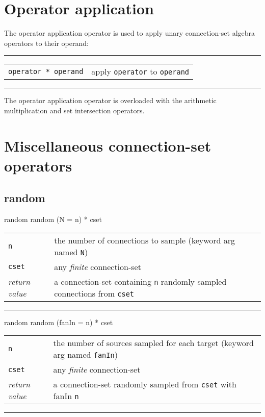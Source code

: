 \documentclass[a4paper,twoside]{report}
\makeatletter
\newenvironment{parameters}%
{\begin{tabular}{@{\hspace{2em}}lp{0.6\textwidth}}}%
{\end{tabular}\par\vspace{1mm}\par\hrule\par\vspace{5mm}}
\newcommand{\fa}[1]{\lstinline|#1|}
\newcommand{\expr}[1]{\lstinline|#1|}
\newcommand{\ret}{\emph{return value}}
\makeatother
\begin{document}
\section{Operator application}
The operator application operator is used to apply unary
connection-set algebra operators to their operand:
\par\vspace{4mm}\hrule\par\vspace{1mm}
\begin{tabular}{@{\hspace{2em}}lp{}}
  \expr{operator * operand} & apply \fa{operator} to \fa{operand}\\
\end{tabular}\par\vspace{1mm}\par\hrule\par\vspace{5mm}
The operator application operator is overloaded with the arithmetic
multiplication and set intersection operators.

\section{Miscellaneous connection-set operators}\label{sec:miscop}

\subsection{random}\label{sec:randomop}
\begin{head}{random}
  random (N = n) * cset
\end{head}
\begin{parameters}
  \lstinline|n| &%
  the number of connections to sample (keyword arg named \fa{N})\\
  \fa{cset} &%
  any \emph{finite} connection-set\\
  \ret &%
  a connection-set containing \fa{n} randomly sampled connections from
  \fa{cset}\\
\end{parameters}

\begin{head}{random}
  random (fanIn = n) * cset
\end{head}
\begin{parameters}
  \lstinline|n| &%
  the number of sources sampled for each target (keyword arg named \fa{fanIn})\\
  \fa{cset} &%
  any \emph{finite} connection-set\\
  \ret &%
  a connection-set randomly sampled from \fa{cset} with fanIn \fa{n}\\
\end{parameters}
\end{document}
